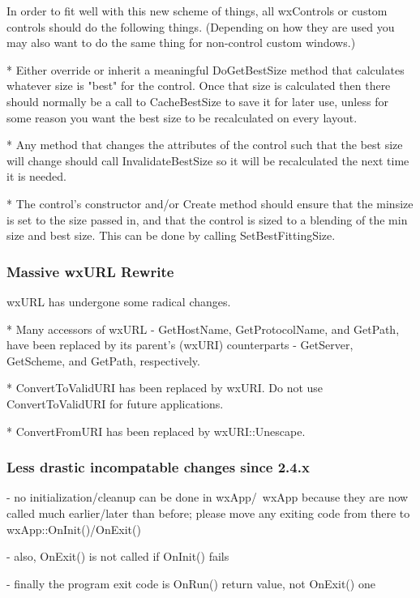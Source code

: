   In order to fit well with this new scheme of things, all wxControls
  or custom controls should do the following things.  (Depending on
  how they are used you may also want to do the same thing for
  non-control custom windows.)

    * Either override or inherit a meaningful DoGetBestSize method
      that calculates whatever size is "best" for the control.  Once
      that size is calculated then there should normally be a call to
      CacheBestSize to save it for later use, unless for some reason
      you want the best size to be recalculated on every layout.

    * Any method that changes the attributes of the control such that
      the best size will change should call InvalidateBestSize so it
      will be recalculated the next time it is needed.

    * The control's constructor and/or Create method should ensure
      that the minsize is set to the size passed in, and that the
      control is sized to a blending of the min size and best size.
      This can be done by calling SetBestFittingSize.

\subsubsection{Massive wxURL Rewrite}

wxURL has undergone some radical changes.

    * Many accessors of wxURL - GetHostName, GetProtocolName, and GetPath,
      have been replaced by its parent's (wxURI) counterparts - GetServer,
      GetScheme, and GetPath, respectively.
  
    * ConvertToValidURI has been replaced by wxURI.  Do not use 
      ConvertToValidURI for future applications.

    * ConvertFromURI has been replaced by wxURI::Unescape.

\subsubsection{Less drastic incompatable changes since 2.4.x}

- no initialization/cleanup can be done in wxApp/~wxApp because they are
  now called much earlier/later than before; please move any exiting code
  from there to wxApp::OnInit()/OnExit()

- also, OnExit() is not called if OnInit() fails

- finally the program exit code is OnRun() return value, not OnExit() one

